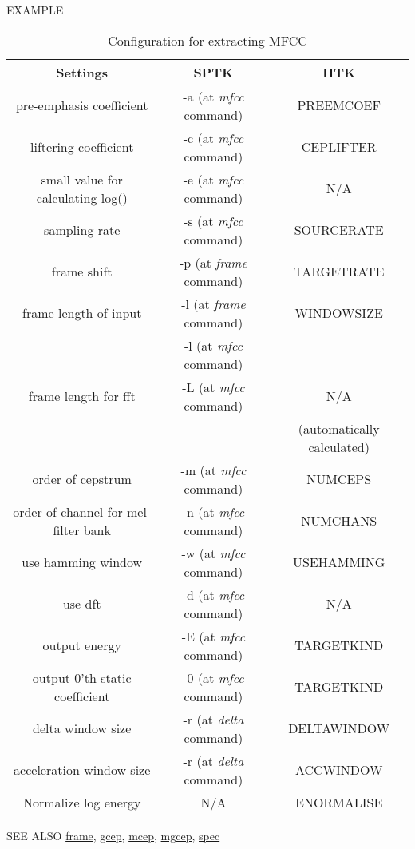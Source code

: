 \begin{qsection}{EXAMPLE}
\setcounter{table}{1}
\begin{table}
        \caption{Configuration for extracting MFCC}
        \label{tbl:mfcc_config}
        \setlength{\arrayrulewidth}{0.5pt}
        \renewcommand{\arraystretch}{1.2}
        \begin{center}
        \begin{tabular}{|c||c|c|} \hline
        Settings                          & SPTK  & HTK \\ \hline\hline
        pre-emphasis coefficient             & -a (at {\em mfcc} command)& PREEMCOEF \\ \hline
        liftering coefficient                & -c (at {\em mfcc} command) & CEPLIFTER \\ \hline
        small value for calculating log()    & -e (at {\em mfcc} command)& N/A \\ \hline
        sampling rate                        & -s (at {\em mfcc} command)& SOURCERATE \\ \hline
        frame shift                          & -p (at {\em frame} command) & TARGETRATE \\ \hline
        frame length of input                & -l (at {\em frame} command) & WINDOWSIZE \\ 
                                             & -l (at {\em mfcc} command)&  \\ \hline
        frame length for fft                 & -L (at {\em mfcc} command)& N/A \\
                                             &    & (automatically calculated) \\ \hline
        order of cepstrum                    & -m (at {\em mfcc} command)& NUMCEPS \\ \hline
        order of channel for mel-filter bank & -n (at {\em mfcc} command)& NUMCHANS \\ \hline
        use hamming window                   & -w (at {\em mfcc} command)& USEHAMMING \\ \hline
        use dft                              & -d (at {\em mfcc} command)& N/A \\ \hline
        output energy                        & -E (at {\em mfcc} command)& TARGETKIND \\ \hline
        output $0$'th static coefficient     & -0 (at {\em mfcc} command)& TARGETKIND \\ \hline 
        delta window size                    & -r (at {\em delta} command)& DELTAWINDOW \\ \hline
        acceleration window size             & -r (at {\em delta} command)& ACCWINDOW \\ \hline
        Normalize log energy                 & N/A & ENORMALISE \\  
        \hline
        \end{tabular}
        \end{center}
\label{tbl:mfcc_config}
\end{table}
\end{qsection}

\begin{qsection}{SEE ALSO}
\hyperlink{frame}{frame},
\hyperlink{gcep}{gcep},
\hyperlink{mcep}{mcep},
\hyperlink{mgcep}{mgcep},
\hyperlink{spec}{spec}
\end{qsection}
